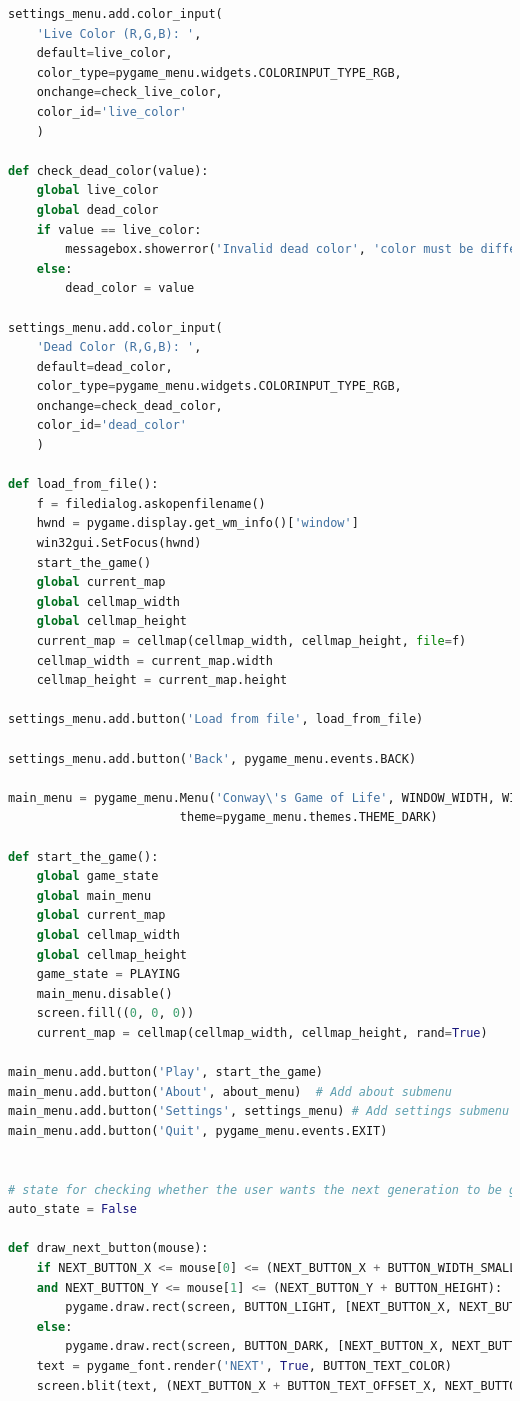 \documentclass[12pt]{report}
\begin{document}
\begin{lstlisting}[language=Python, caption=game\_of\_life.py]
settings_menu.add.color_input(
    'Live Color (R,G,B): ',
    default=live_color,
    color_type=pygame_menu.widgets.COLORINPUT_TYPE_RGB,
    onchange=check_live_color,
    color_id='live_color'
    )

def check_dead_color(value):
    global live_color
    global dead_color
    if value == live_color:
        messagebox.showerror('Invalid dead color', 'color must be different from livecolor')
    else:
        dead_color = value

settings_menu.add.color_input(
    'Dead Color (R,G,B): ',
    default=dead_color,
    color_type=pygame_menu.widgets.COLORINPUT_TYPE_RGB,
    onchange=check_dead_color,
    color_id='dead_color'
    )

def load_from_file():
    f = filedialog.askopenfilename()
    hwnd = pygame.display.get_wm_info()['window']
    win32gui.SetFocus(hwnd)
    start_the_game()
    global current_map
    global cellmap_width
    global cellmap_height
    current_map = cellmap(cellmap_width, cellmap_height, file=f)
    cellmap_width = current_map.width
    cellmap_height = current_map.height

settings_menu.add.button('Load from file', load_from_file)

settings_menu.add.button('Back', pygame_menu.events.BACK)

main_menu = pygame_menu.Menu('Conway\'s Game of Life', WINDOW_WIDTH, WINDOW_HEIGHT,
                        theme=pygame_menu.themes.THEME_DARK)

def start_the_game():
    global game_state
    global main_menu
    global current_map
    global cellmap_width
    global cellmap_height
    game_state = PLAYING
    main_menu.disable()
    screen.fill((0, 0, 0))
    current_map = cellmap(cellmap_width, cellmap_height, rand=True)

main_menu.add.button('Play', start_the_game)
main_menu.add.button('About', about_menu)  # Add about submenu
main_menu.add.button('Settings', settings_menu) # Add settings submenu
main_menu.add.button('Quit', pygame_menu.events.EXIT)


# state for checking whether the user wants the next generation to be generated automatically
auto_state = False

def draw_next_button(mouse):
    if NEXT_BUTTON_X <= mouse[0] <= (NEXT_BUTTON_X + BUTTON_WIDTH_SMALL) \
    and NEXT_BUTTON_Y <= mouse[1] <= (NEXT_BUTTON_Y + BUTTON_HEIGHT):
        pygame.draw.rect(screen, BUTTON_LIGHT, [NEXT_BUTTON_X, NEXT_BUTTON_Y, BUTTON_WIDTH_SMALL, BUTTON_HEIGHT])
    else:
        pygame.draw.rect(screen, BUTTON_DARK, [NEXT_BUTTON_X, NEXT_BUTTON_Y, BUTTON_WIDTH_SMALL, BUTTON_HEIGHT])
    text = pygame_font.render('NEXT', True, BUTTON_TEXT_COLOR)
    screen.blit(text, (NEXT_BUTTON_X + BUTTON_TEXT_OFFSET_X, NEXT_BUTTON_Y + BUTTON_TEXT_OFFSET_Y))


\end{lstlisting}
\end{document}
